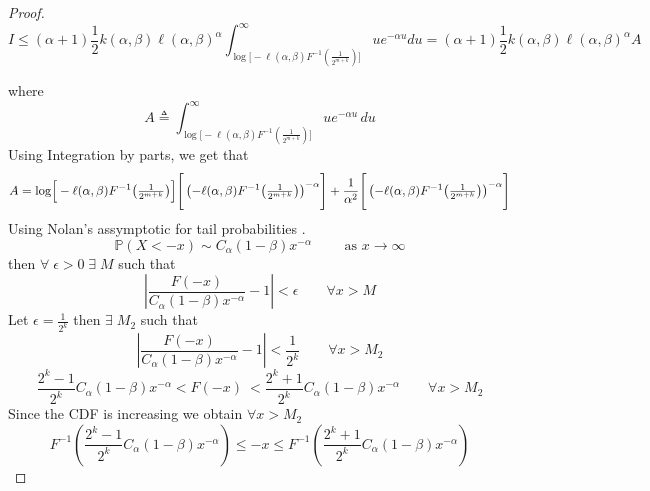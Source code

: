 \documentclass{article}
\theoremstyle{definition}
\begin{document}
\begin{proof}
 \begin{equation}\label{eq:bound for I}
I\leq(\alpha+1)\frac{1}{2}k(\alpha,\beta)\ell(\alpha,\beta)^{\alpha} \int_{\log\Bigr[-\ell(\alpha,\beta) F^{-1}\left(\frac{1}{2^{m+k}}\right)\Bigr]}^{\infty } ue^{-\alpha u} du = (\alpha+1)\frac{1}{2}k(\alpha,\beta)\ell(\alpha,\beta)^{\alpha} A
\end{equation}

where \begin{equation}
    A\triangleq \int_{\log\Bigr[-\ell(\alpha,\beta)
F^{-1}(\tfrac{1}{2^{m+k}})\Bigr]}^{\infty }
u e^{-\alpha u}\,du
\end{equation} Using Integration by parts, we get that \begin{equation}\label{eq:Iintergal}
A= \log\Bigr[-\ell(\alpha,\beta)
F^{-1}\!\left(\tfrac{1}{2^{m+k}}\right)\Bigr]
\Biggr[\left(-\ell(\alpha,\beta)
F^{-1}\!\left(\tfrac{1}{2^{m+k}}\right)\right)^{-\alpha}\Biggr] \\
 +\frac{1}{\alpha^2}
 \Biggr[\left(-\ell(\alpha,\beta)
F^{-1}\!\left(\tfrac{1}{2^{m+k}}\right)\right)^{-\alpha}\Biggr]    
\end{equation}
 Using Nolan's assymptotic for tail probabilities \cite{NolanJohnP2020USDM}.
 \begin{equation}
     \mathbb{P}(X<-x)\sim  C_{\alpha}(1-\beta)x^{-\alpha}  \qquad \text{ as } x\to\infty\end{equation} 
then $\forall \; \epsilon >0\;  \exists\; M$ such that \begin{equation}
    \left\lvert \frac{F(-x)}{ C_{\alpha}(1-\beta)x^{-\alpha}}-1\right\rvert <\epsilon\qquad \forall x>M
\end{equation} 
Let $\epsilon=\frac{1}{2^{k}}$ then $\exists \; M_2$ such that 
\begin{equation}
    \left\lvert \frac{F(-x)}{ C_{\alpha}(1-\beta)x^{-\alpha}}-1\right\rvert <\frac{1}{2^{k} }\qquad \forall x>M_2 
\end{equation}
\begin{equation}
    \frac{2^{k}-1}{2^{k}} C_{\alpha}(1-\beta)x^{-\alpha}<  F(-x)\ <\frac{2^{k}+1}{2^{k} } C_{\alpha}(1-\beta)x^{-\alpha}\qquad \forall x>M_2
\end{equation} 
Since the CDF is increasing we obtain $\forall x>M_2$
\begin{equation}
F^{-1}\left(\frac{2^{k}-1}{2^{k}} C_{\alpha}(1-\beta)x^{-\alpha}\right) \leq 
-x \leq F^{-1}\left( \frac{2^{k}+1}{2^{k} }C_{\alpha}(1-\beta)x^{-\alpha}\right) \label{eq:star}
\end{equation}

\end{proof}
\end{document}
